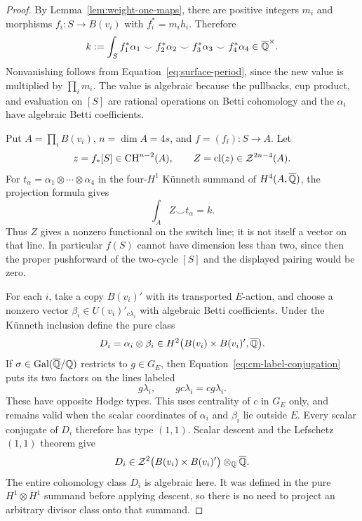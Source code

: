\begin{proof}
By Lemma~\ref{lem:weight-one-maps}, there are positive integers \(m_i\)
and morphisms \(f_i:S\to B(v_i)\) with \(f_i^*=m_i h_i\).  Therefore
\begin{equation}\label{eq:surface-morphism-period}
 k:=\int_S f_1^*\alpha_1\smile f_2^*\alpha_2
              \smile f_3^*\alpha_3\smile f_4^*\alpha_4
 \in\overline{\mathbb{Q}}^\times.
\end{equation}
Nonvanishing follows from Equation~\eqref{eq:surface-period}, since
the new value is multiplied by \(\prod_i m_i\).  The value is
algebraic because the pullbacks, cup product, and evaluation on
\([S]\) are rational operations on Betti cohomology and the
\(\alpha_i\) have algebraic Betti coefficients.

Put \(A=\prod_iB(v_i)\), \(n=\dim A=4s\), and \(f=(f_i):S\to A\).
Let
\[
 z=f_*[S]\in\operatorname{CH}^{n-2}(A),\qquad
 Z=\operatorname{cl}(z)\in\mathcal Z^{2n-4}(A).
\]
For \(t_\alpha=\alpha_1\otimes\cdots\otimes\alpha_4\) in the
four-\(H^1\) Künneth summand of \(H^4(A,\overline{\mathbb{Q}})\), the projection
formula gives
\begin{equation}\label{eq:surface-functional}
 \int_A Z\smile t_\alpha=k.
\end{equation}
Thus \(Z\) gives a nonzero functional on the switch line; it is not
itself a vector on that line.  In particular \(f(S)\) cannot have
dimension less than two, since then the proper pushforward of the
two-cycle \([S]\) and the displayed pairing would be zero.

For each \(i\), take a copy \(B(v_i)'\) with its transported
\(E\)-action, and choose a nonzero vector
\(\beta_i\in U(v_i)'_{c\lambda_i}\) with algebraic Betti coefficients.
Under the Künneth inclusion define the pure class
\[
 D_i=\alpha_i\otimes\beta_i
 \in H^2\bigl(B(v_i)\times B(v_i)',\overline{\mathbb{Q}}\bigr).
\]
If \(\sigma\in\operatorname{Gal}(\overline{\mathbb{Q}}/\mathbb{Q})\) restricts to \(g\in G_E\), then
Equation~\eqref{eq:cm-label-conjugation} puts its two factors on the
lines labeled
\[
 g\lambda_i,\qquad gc\lambda_i=cg\lambda_i.
\]
These have opposite Hodge types.  This uses centrality of \(c\) in
\(G_E\) only, and remains valid when the scalar coordinates of
\(\alpha_i\) and \(\beta_i\) lie outside \(E\).  Every scalar
conjugate of \(D_i\) therefore has type \((1,1)\).  Scalar descent
and the Lefschetz \((1,1)\) theorem give
\begin{equation}\label{eq:surface-divisor-kernels}
 D_i\in
 \mathcal Z^2\bigl(B(v_i)\times B(v_i)'\bigr)\otimes_{\mathbb{Q}}\overline{\mathbb{Q}}.
\end{equation}
The entire cohomology class \(D_i\) is algebraic here.  It was defined
in the pure \(H^1\otimes H^1\) summand before applying descent, so
there is no need to project an arbitrary divisor class onto that
summand.


\end{proof}
